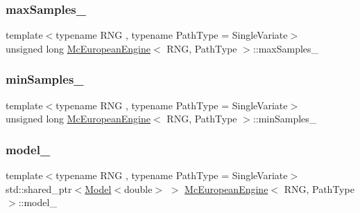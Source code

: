 \subsubsection{\texorpdfstring{max\+Samples\+\_\+}{maxSamples\_}}
{\footnotesize\ttfamily template$<$typename R\+NG , typename Path\+Type  = Single\+Variate$>$ \\
unsigned long \hyperlink{class_mc_european_engine}{Mc\+European\+Engine}$<$ R\+NG, Path\+Type $>$\+::max\+Samples\+\_\+\hspace{0.3cm}{\ttfamily [private]}}

\hypertarget{class_mc_european_engine_a3e90a1e87e9096d2cbeebc45b0bb358b}{}\label{class_mc_european_engine_a3e90a1e87e9096d2cbeebc45b0bb358b} 
\subsubsection{\texorpdfstring{min\+Samples\+\_\+}{minSamples\_}}
{\footnotesize\ttfamily template$<$typename R\+NG , typename Path\+Type  = Single\+Variate$>$ \\
unsigned long \hyperlink{class_mc_european_engine}{Mc\+European\+Engine}$<$ R\+NG, Path\+Type $>$\+::min\+Samples\+\_\+\hspace{0.3cm}{\ttfamily [private]}}

\hypertarget{class_mc_european_engine_a1065e84b2bf625de4ea8d9ed02eb15bf}{}\label{class_mc_european_engine_a1065e84b2bf625de4ea8d9ed02eb15bf} 
\subsubsection{\texorpdfstring{model\+\_\+}{model\_}}
{\footnotesize\ttfamily template$<$typename R\+NG , typename Path\+Type  = Single\+Variate$>$ \\
std\+::shared\+\_\+ptr$<$\hyperlink{class_model}{Model}$<$double$>$ $>$ \hyperlink{class_mc_european_engine}{Mc\+European\+Engine}$<$ R\+NG, Path\+Type $>$\+::model\+\_\+\hspace{0.3cm}{\ttfamily [private]}}

\hypertarget{class_mc_european_engine_abb61c5565c1f4a1775f04d4d28bd5d21}{}\label{class_mc_european_engine_abb61c5565c1f4a1775f04d4d28bd5d21} 
